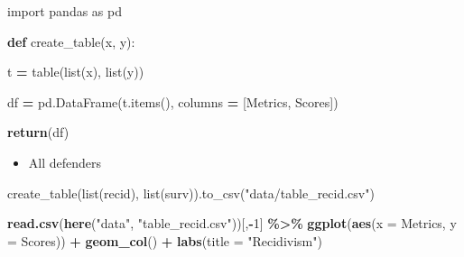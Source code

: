 \documentclass[
]{book}
\newenvironment{Shaded}{\begin{snugshade}}{\end{snugshade}}
\newcommand{\BuiltInTok}[1]{#1}
\newcommand{\ControlFlowTok}[1]{\textcolor[rgb]{0.13,0.29,0.53}{\textbf{#1}}}
\newcommand{\DataTypeTok}[1]{\textcolor[rgb]{0.13,0.29,0.53}{#1}}
\newcommand{\DecValTok}[1]{\textcolor[rgb]{0.00,0.00,0.81}{#1}}
\newcommand{\ImportTok}[1]{#1}
\newcommand{\KeywordTok}[1]{\textcolor[rgb]{0.13,0.29,0.53}{\textbf{#1}}}
\newcommand{\NormalTok}[1]{#1}
\newcommand{\OperatorTok}[1]{\textcolor[rgb]{0.81,0.36,0.00}{\textbf{#1}}}
\newcommand{\StringTok}[1]{\textcolor[rgb]{0.31,0.60,0.02}{#1}}
\providecommand{\tightlist}{%
  \setlength{\itemsep}{0pt}\setlength{\parskip}{0pt}}
\begin{document}
\begin{Shaded}
\begin{Highlighting}[]

\ImportTok{import}\NormalTok{ pandas }\ImportTok{as}\NormalTok{ pd }

\KeywordTok{def}\NormalTok{ create\_table(x, y):}

\NormalTok{  t }\OperatorTok{=}\NormalTok{ table(}\BuiltInTok{list}\NormalTok{(x), }\BuiltInTok{list}\NormalTok{(y))}
  
\NormalTok{  df }\OperatorTok{=}\NormalTok{ pd.DataFrame(t.items(), }
\NormalTok{             columns }\OperatorTok{=}\NormalTok{ [}\StringTok{\textquotesingle{}Metrics\textquotesingle{}}\NormalTok{, }\StringTok{\textquotesingle{}Scores\textquotesingle{}}\NormalTok{])}
             
  \ControlFlowTok{return}\NormalTok{(df)}
             
\end{Highlighting}
\end{Shaded}

\begin{itemize}
\tightlist
\item
  All defenders
\end{itemize}

\begin{Shaded}
\begin{Highlighting}[]

\NormalTok{create\_table(}\BuiltInTok{list}\NormalTok{(recid), }\BuiltInTok{list}\NormalTok{(surv)).to\_csv(}\StringTok{"data/table\_recid.csv"}\NormalTok{)}
\end{Highlighting}
\end{Shaded}

\begin{Shaded}
\begin{Highlighting}[]
\KeywordTok{read.csv}\NormalTok{(}\KeywordTok{here}\NormalTok{(}\StringTok{"data"}\NormalTok{, }\StringTok{"table\_recid.csv"}\NormalTok{))[,}\OperatorTok{{-}}\DecValTok{1}\NormalTok{] }\OperatorTok{\%\textgreater{}\%}
\StringTok{  }\KeywordTok{ggplot}\NormalTok{(}\KeywordTok{aes}\NormalTok{(}\DataTypeTok{x =}\NormalTok{ Metrics, }\DataTypeTok{y =}\NormalTok{ Scores)) }\OperatorTok{+}
\StringTok{  }\KeywordTok{geom\_col}\NormalTok{() }\OperatorTok{+}
\StringTok{  }\KeywordTok{labs}\NormalTok{(}\DataTypeTok{title =} \StringTok{"Recidivism"}\NormalTok{)}
\end{Highlighting}
\end{Shaded}
\end{document}
